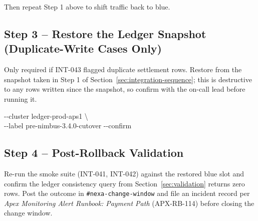 Then repeat Step 1 above to shift traffic back to blue.

\subsection{Step 3 -- Restore the Ledger Snapshot (Duplicate-Write Cases Only)}
Only required if INT-043 flagged duplicate settlement rows. Restore from the snapshot taken in
Step 1 of Section~\ref{sec:integration-sequence}; this is destructive to any rows written since
the snapshot, so confirm with the on-call lead before running it.

\begin{cmdbox}
\hspace*{1.4em}-{}-cluster ledger-prod-aps1 \textbackslash\\
\hspace*{1.4em}-{}-label pre-nimbus-3.4.0-cutover -{}-confirm
\end{cmdbox}

\subsection{Step 4 -- Post-Rollback Validation}
Re-run the smoke suite (INT-041, INT-042) against the restored blue slot and confirm the
ledger consistency query from Section~\ref{sec:validation} returns zero rows. Post the outcome
in \texttt{\#nexa-change-window} and file an incident record per
\emph{Apex Monitoring Alert Runbook: Payment Path} (APX-RB-114) before closing the change
window.
